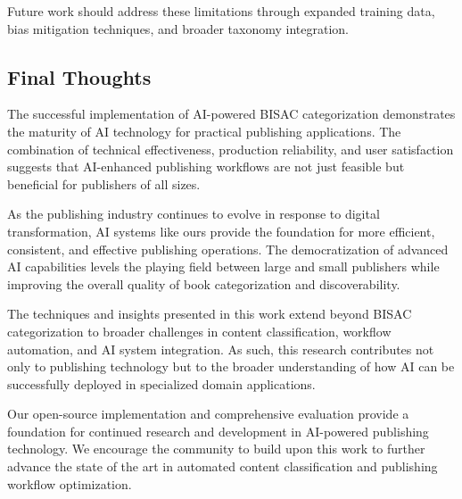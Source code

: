 \documentclass{article}
\begin{document}
Future work should address these limitations through expanded training data, bias mitigation techniques, and broader taxonomy integration.

\subsection{Final Thoughts}

The successful implementation of AI-powered BISAC categorization demonstrates the maturity of AI technology for practical publishing applications. The combination of technical effectiveness, production reliability, and user satisfaction suggests that AI-enhanced publishing workflows are not just feasible but beneficial for publishers of all sizes.

As the publishing industry continues to evolve in response to digital transformation, AI systems like ours provide the foundation for more efficient, consistent, and effective publishing operations. The democratization of advanced AI capabilities levels the playing field between large and small publishers while improving the overall quality of book categorization and discoverability.

The techniques and insights presented in this work extend beyond BISAC categorization to broader challenges in content classification, workflow automation, and AI system integration. As such, this research contributes not only to publishing technology but to the broader understanding of how AI can be successfully deployed in specialized domain applications.

Our open-source implementation and comprehensive evaluation provide a foundation for continued research and development in AI-powered publishing technology. We encourage the community to build upon this work to further advance the state of the art in automated content classification and publishing workflow optimization.
\end{document}
